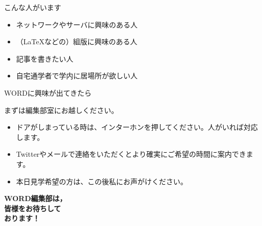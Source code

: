 \documentclass[lualatex]{beamer}
\begin{document}
\begin{frame}[plain]{こんな人がいます}
 \begin{itemize}
  \item ネットワークやサーバに興味のある人
  \item （\LaTeX などの）組版に興味のある人
  \item 記事を書きたい人
  \item 自宅通学者で学内に居場所が欲しい人
 \end{itemize}
\end{frame}

\begin{frame}[plain]{WORDに興味が出てきたら}
  
  \begin{center}
  まずは編集部室にお越しください。
  \end{center}

  \begin{itemize}
     \item ドアがしまっている時は、インターホンを押してください。人がいれば対応します。
     \item Twitterやメールで連絡をいただくとより確実にご希望の時間に案内できます。
    \item 本日見学希望の方は、この後私にお声がけください。
  \end{itemize}
\end{frame}


\begin{frame}[plain]
 \begin{center}
  \Huge\textbf{WORD編集部は，\\皆様をお待ちして\\おります！}
 \end{center}
\end{frame}
\end{document}
